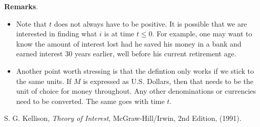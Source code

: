 \documentclass[12pt]{article}
\begin{document}
\textbf{Remarks}.
\begin{itemize}
\item
Note that $t$ does not always have to be positive.  It is possible that we are interested in finding what $i$ is at time $t\le 0$.  For example, one may want to know the amount of interest lost had he saved his money in a bank and earned interest 30 years earlier, well before his current retirement age.
\item
Another point worth stressing is that the defintion only works if we stick to the same units.  If $M$ is expressed as U.S. Dollars, then that needs to be the unit of choice for money throughout.  Any other denominations or currencies need to be converted.  The same goes with time $t$.
\end{itemize}

\begin{thebibliography}{8}
 S. G. Kellison, {\em Theory of Interest}, McGraw-Hill/Irwin, 2nd Edition, (1991).
\end{thebibliography}
\end{document}
